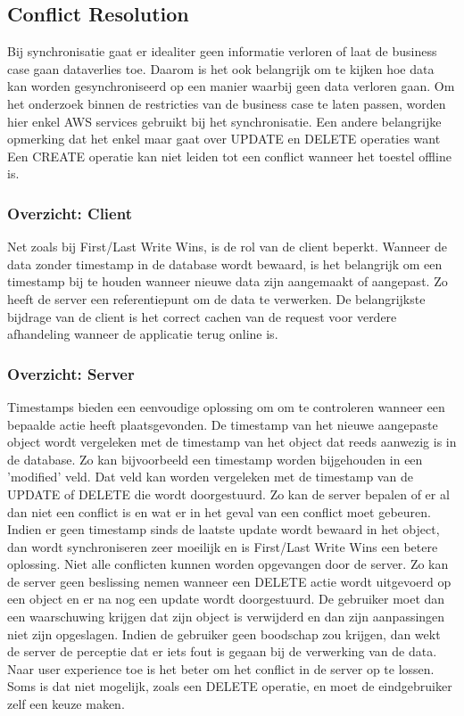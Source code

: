\subsection{Conflict Resolution}
Bij synchronisatie gaat er idealiter geen informatie verloren of laat de business case gaan dataverlies toe. Daarom is het ook belangrijk om te kijken hoe data kan worden gesynchroniseerd op een manier waarbij geen data verloren gaan. Om het onderzoek binnen de restricties van de business case te laten passen, worden hier enkel AWS services gebruikt bij het synchronisatie. Een andere belangrijke opmerking dat het enkel maar gaat over UPDATE en DELETE operaties want Een CREATE operatie kan niet leiden tot een conflict wanneer het toestel offline is.
\subsubsection{Overzicht: Client}
Net zoals bij First/Last Write Wins, is de rol van de client beperkt. Wanneer de data zonder timestamp in de database wordt bewaard, is het belangrijk om een timestamp bij te houden wanneer nieuwe data zijn aangemaakt of aangepast. Zo heeft de server een referentiepunt om de data te verwerken. De belangrijkste bijdrage van de client is het correct cachen van de request voor verdere afhandeling wanneer de applicatie terug online is.
\subsubsection{Overzicht: Server}
Timestamps bieden een eenvoudige oplossing om om te  controleren wanneer een bepaalde actie heeft plaatsgevonden. De timestamp van het nieuwe aangepaste object wordt vergeleken met de timestamp van het object dat reeds aanwezig is in de database. Zo kan bijvoorbeeld een timestamp worden bijgehouden in een 'modified' veld. Dat veld kan worden vergeleken met de timestamp van de UPDATE of DELETE die wordt doorgestuurd. Zo kan de server bepalen of er al dan niet een conflict is en wat er in het geval van een conflict moet gebeuren. Indien er geen timestamp sinds de laatste update wordt bewaard in het object, dan wordt synchroniseren zeer moeilijk en is First/Last Write Wins een betere oplossing. Niet alle conflicten kunnen worden opgevangen door de server. Zo kan de server geen beslissing nemen wanneer een DELETE actie wordt uitgevoerd op een object en er na nog een update wordt doorgestuurd. De gebruiker moet dan een waarschuwing krijgen dat zijn object is verwijderd en dan zijn aanpassingen niet zijn opgeslagen. Indien de gebruiker geen boodschap zou krijgen, dan wekt de server de perceptie dat er iets fout is gegaan bij de verwerking van de data. Naar user experience toe is het beter om het conflict in de server op te lossen. Soms is dat niet mogelijk, zoals een DELETE operatie, en moet de eindgebruiker zelf een keuze maken.
